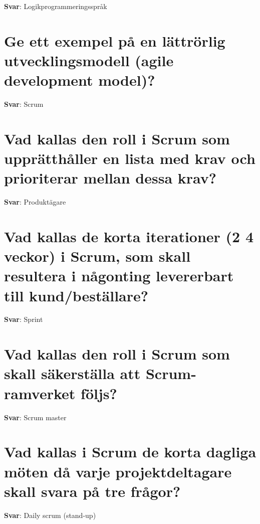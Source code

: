 \documentclass[a4paper,11pt,oneside]{book}
\begin{document}
\begin{sloppypar}
\label{q:39:sa:sv:True}

\textbf{Svar}: Logikprogrammeringsspr\r{a}k



\section{Ge ett exempel p\r{a} en l\"attr\"orlig utvecklingsmodell (agile development model)?}

\label{q:40:sa:sv:True}

\textbf{Svar}: Scrum



\section{Vad kallas den roll i Scrum som uppr\"atth\r{a}ller en lista med krav och prioriterar mellan dessa krav?}

\label{q:41:sa:sv:True}

\textbf{Svar}: Produkt\"agare



\section{Vad kallas de korta iterationer (2 {\textendash} 4 veckor) i Scrum, som skall resultera i n\r{a}gonting levererbart till kund/best\"allare?}

\label{q:42:sa:sv:True}

\textbf{Svar}: Sprint



\section{Vad kallas den roll i Scrum som skall s\"akerst\"alla att Scrum-ramverket f\"oljs?}

\label{q:43:sa:sv:True}

\textbf{Svar}: Scrum master



\section{Vad kallas i Scrum de korta dagliga m\"oten d\r{a} varje projektdeltagare skall svara p\r{a} tre fr\r{a}gor?}

\label{q:44:sa:sv:True}

\textbf{Svar}: Daily scrum (stand-up)




\end{sloppypar}
\end{document}
